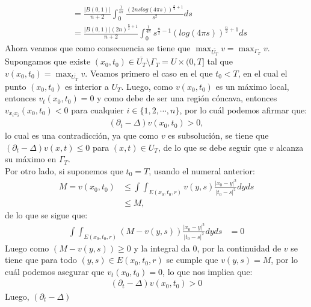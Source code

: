 \begin{homeworkProblem}
\begin{solucion}
\begin{align*}
      &= \frac{|B(0,1)|}{n+2} \int_{0}^{\frac{1}{4\pi}} \frac{(2nslog(4\pi s))^{\frac{n}{2} +1}}{s^{2}} ds\\
      &= \frac{|B(0,1)|(2n)^{\frac{n}{2}+1}}{n+2} \int_{0}^{\frac{1}{4\pi}} s^{\frac{n}{2}-1} (log(4\pi s))^{\frac{n}{2}+1}ds
    \end{align*}
    \demostrado
    Ahora veamos que como consecuencia se tiene que $\max_{\overline{U_T}}v=\max_{\Gamma_T}v$.\\
    Supongamos que existe $(x_0,t_0)\in\overline{U_T}\setminus\Gamma_T=U\times (0,T]$ tal que $v(x_0,t_0)=\max_{\overline{U_T}}v$. Veamos primero el caso en el que $t_0<T$, en el cual el punto $(x_0,t_0)$ es interior a $U_T$. Luego, como $v(x_0,t_0)$ es un máximo local, entonces $v_t(x_0,t_0)=0$ y como debe de ser una región cóncava, entonces $v_{x_ix_i}(x_0,t_0)<0$ para cualquier $i\in\{1,2,\cdots,n\}$, por lo cuál podemos afirmar que:
    \begin{align*}
      (\partial_t-\Delta)v(x_0,t_0)> 0,
    \end{align*}
    lo cual es una contradicción, ya que como $v$ es subsolución, se tiene que $(\partial_t-\Delta)v(x,t)\leq 0$ para $(x,t)\in U_T$, de lo que se debe seguir que $v$ alcanza su máximo en $\Gamma_T$.\\
    Por otro lado, si suponemos que $t_0=T$, usando el numeral anterior:
    \begin{align*}
      M=v(x_0,t_0)&\leq \int \int_{E(x_0,t_0,r)}v(y,s)\frac{|x_0-y|^2}{|t_0-s|^2}dyds\\
      &\leq M,
    \end{align*}
    de lo que se sigue que:
    \begin{align*}
      \int \int_{E(x_0,t_0,r)}(M-v(y,s))\frac{|x_0-y|^2}{|t_0-s|^2}dyds &=0
    \end{align*}
    Luego como $(M-v(y,s))\geq 0$ y la integral da $0$, por la continuidad de $v$  se tiene que para todo $(y,s)\in E(x_0,t_0,r)$ se cumple que $v(y,s)=M$, por lo cuál podemos asegurar que $v_t(x_0,t_0)=0$, lo que nos implica que: 
    \begin{align*}
      (\partial_t-\Delta)v(x_0,t_0)> 0
    \end{align*}
    Luego, $(\partial_{t}-\Delta)$
  \end{solucion}  
\end{homeworkProblem}
